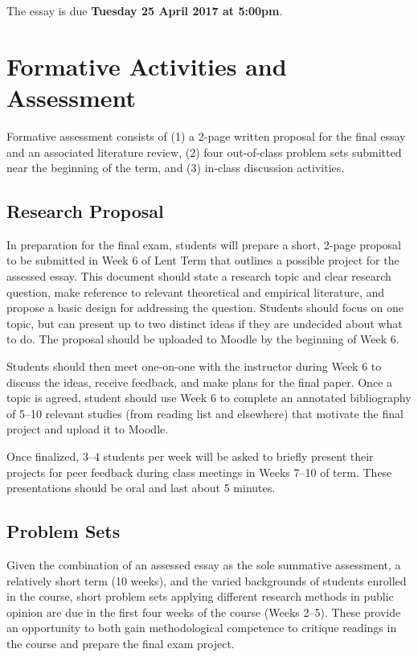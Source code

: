 \documentclass[12pt,a4paper]{article}
\begin{document}
\vspace{1em}

\noindent The essay is due \textbf{Tuesday 25 April 2017 at 5:00pm}.


\section{Formative Activities and Assessment}

Formative assessment consists of (1) a 2-page written proposal for the final essay and an associated literature review, (2) four out-of-class problem sets submitted near the beginning of the term, and (3) in-class discussion activities.

\subsection{Research Proposal}

In preparation for the final exam, students will prepare a short, 2-page proposal to be submitted in Week 6 of Lent Term that outlines a possible project for the assessed essay. This document should state a research topic and clear research question, make reference to relevant theoretical and empirical literature, and propose a basic design for addressing the question. Students should focus on one topic, but can present up to two distinct ideas if they are undecided about what to do. The proposal should be uploaded to Moodle by the beginning of Week 6.

Students should then meet one-on-one with the instructor during Week 6 to discuss the ideas, receive feedback, and make plans for the final paper. Once a topic is agreed, student should use Week 6 to complete an annotated bibliography of 5--10 relevant studies (from reading list and elsewhere) that motivate the final project and upload it to Moodle.

Once finalized, 3--4 students per week will be asked to briefly present their projects for peer feedback during class meetings in Weeks 7--10 of term. These presentations should be oral and last about 5 minutes.

\subsection{Problem Sets}

Given the combination of an assessed essay as the sole summative assessment, a relatively short term (10 weeks), and the varied backgrounds of students enrolled in the course, short problem sets applying different research methods in public opinion are due in the first four weeks of the course (Weeks 2--5). These provide an opportunity to both gain methodological competence to critique readings in the course and prepare the final exam project.
\end{document}
